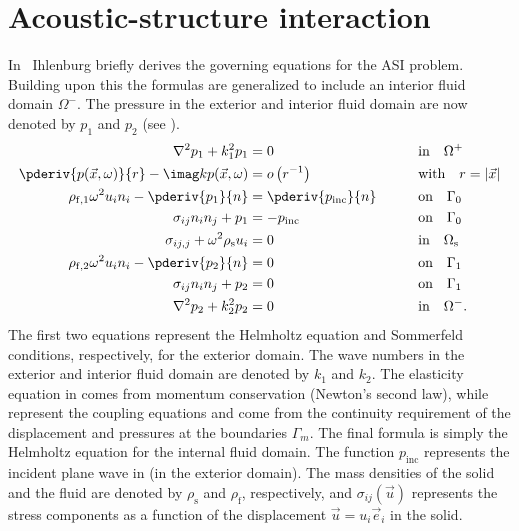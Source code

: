 \section{Acoustic-structure interaction}
\label{Sec2:coupledFluidStruct}
In~\cite[pp. 13-14]{Ihlenburg1998fea} Ihlenburg briefly derives the governing equations for the ASI problem. Building upon this the formulas are generalized to include an interior fluid domain $\Omega^-$. The pressure in the exterior and interior fluid domain are now denoted by $p_1$ and $p_2$ (see ).
\begin{alignat}{3}
	\nabla^2 p_1 + k_1^2 p_1 &= 0 	&&\text{in}\quad \Omega^+\\
	\pderiv{p(\vec{x},\omega)}{r}-\imag k p(\vec{x},\omega) &= o\left(r^{-1}\right) &&\text{with}\quad r=|\vec{x}|\label{Eq2:sommerfeldCond2}\\
	\rho_{\mathrm{f},1} \omega^2 u_i n_i - \pderiv{p_1}{n} &= \pderiv{p_{\mathrm{inc}}}{n}\qquad &&\text{on}\quad \Gamma_0\label{Eq2:coupling2}\\
	\sigma_{ij}n_i n_j + p_1 &= -p_{\mathrm{inc}}\qquad &&\text{on}\quad \Gamma_0\label{Eq2:coupling1}\\
	\sigma_{ij,j} + \omega^2 \rho_{\mathrm{s}} u_i &= 0 \qquad &&\text{in}\quad \Omega_{\mathrm{s}}\label{Eq2:strongFormLinEl}\\
	\rho_{\mathrm{f},2} \omega^2 u_i n_i - \pderiv{p_2}{n} &= 0 \qquad &&\text{on}\quad \Gamma_1\label{Eq2:coupling2_2}\\
	\sigma_{ij}n_i n_j + p_2 &= 0\qquad &&\text{on}\quad \Gamma_1\label{Eq2:coupling1_2}\\
	\nabla^2 p_2 + k_2^2 p_2 &= 0 	&&\text{in}\quad \Omega^-.
\end{alignat} 
The first two equations represent the Helmholtz equation and Sommerfeld conditions, respectively, for the exterior domain. The wave numbers in the exterior and interior fluid domain are denoted by $k_1$ and $k_2$. The elasticity equation in  comes from momentum conservation (Newton's second law), while  represent the coupling equations and come from the continuity requirement of the displacement and pressures at the boundaries $\Gamma_m$. The final formula is simply the Helmholtz equation for the internal fluid domain. The function $p_{\mathrm{inc}}$ represents the incident plane wave in  (in the exterior domain). The mass densities of the solid and the fluid are denoted by $\rho_{\mathrm{s}}$ and $\rho_{\mathrm{f}}$, respectively, and $\sigma_{ij}(\vec{u})$ represents the stress components as a function of the displacement $\vec{u}=u_i\vec{e}_i$ in the solid. 

